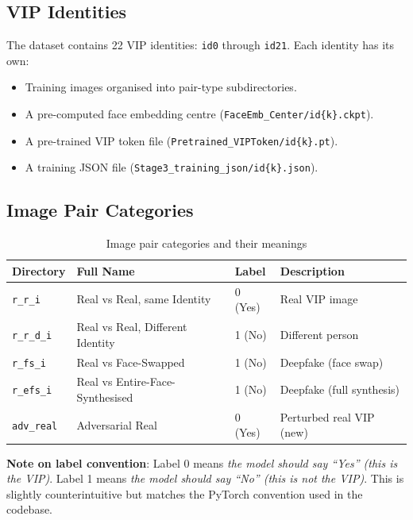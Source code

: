 \documentclass[12pt,a4paper]{article}
\begin{document}
\subsection{VIP Identities}

The dataset contains 22 VIP identities: \texttt{id0} through \texttt{id21}. Each identity has its own:
\begin{itemize}
    \item Training images organised into pair-type subdirectories.
    \item A pre-computed face embedding centre (\texttt{FaceEmb\_Center/id\{k\}.ckpt}).
    \item A pre-trained VIP token file (\texttt{Pretrained\_VIPToken/id\{k\}.pt}).
    \item A training JSON file (\texttt{Stage3\_training\_json/id\{k\}.json}).
\end{itemize}

\subsection{Image Pair Categories}

\begin{table}[H]
\centering
\caption{Image pair categories and their meanings}
\begin{tabular}{@{}llll@{}}
\toprule
\textbf{Directory} & \textbf{Full Name} & \textbf{Label} & \textbf{Description} \\
\midrule
\texttt{r\_r\_i}   & Real vs Real, same Identity & 0 (Yes) & Real VIP image \\
\texttt{r\_r\_d\_i} & Real vs Real, Different Identity & 1 (No) & Different person \\
\texttt{r\_fs\_i}  & Real vs Face-Swapped & 1 (No) & Deepfake (face swap) \\
\texttt{r\_efs\_i} & Real vs Entire-Face-Synthesised & 1 (No) & Deepfake (full synthesis) \\
\texttt{adv\_real} & Adversarial Real & 0 (Yes) & Perturbed real VIP (new) \\
\bottomrule
\end{tabular}
\end{table}

\textbf{Note on label convention}: Label 0 means \textit{the model should say ``Yes'' (this is the VIP)}. Label 1 means \textit{the model should say ``No'' (this is not the VIP)}. This is slightly counterintuitive but matches the PyTorch convention used in the codebase.
\end{document}
